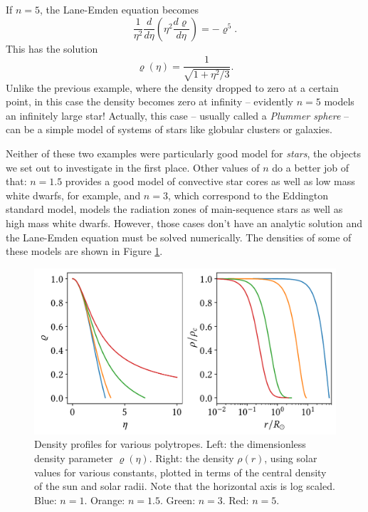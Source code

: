 \begin{example}[n = 5]
If $n = 5$, the Lane-Emden equation becomes
\[
\frac{1}{\eta^2} \frac{d}{d\eta} \left( \eta^2 \frac{d\varrho}{d\eta} \right) = -\varrho^5.
\]
This has the solution
\[
\varrho(\eta) = \frac{1}{\sqrt{1 + \eta^2/3}}.
\]
Unlike the previous example, where the density dropped to zero at a certain point, in this case the density becomes zero at infinity -- evidently $n=5$ models an infinitely large star!  Actually, this case -- usually called a \emph{Plummer sphere} -- can be a simple model of systems of stars like globular clusters or galaxies.
\end{example}

Neither of these two examples were particularly good model for \emph{stars}, the objects we set out to investigate in the first place.  Other values of $n$ do a better job of that:  $n = 1.5$ provides a good model of convective star cores as well as low mass white dwarfs, for example, and $n = 3$, which correspond to the Eddington standard model, models the radiation zones of main-sequence stars as well as high mass white dwarfs.  However, those cases don't have an analytic solution and the Lane-Emden equation must be solved numerically.  The densities of some of these models are shown in Figure \ref{fig_polytropes}.

\begin{figure}
\centering
\includegraphics[width=0.9\linewidth]{Figures/Chapter6/fig_polytropes}
\caption{Density profiles for various polytropes.  Left: the dimensionless density parameter $\varrho(\eta)$.  Right: the density $\rho(r)$, using solar values for various constants, plotted in terms of the central density of the sun and solar radii.  Note that the horizontal axis is log scaled. Blue: $n = 1$.  Orange: $n = 1.5$. Green: $n=3$.  Red: $n=5$. }
\label{fig_polytropes}
\end{figure}


